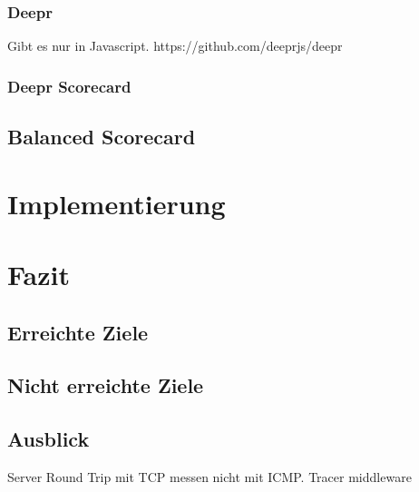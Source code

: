 \subsection{Deepr}
Gibt es nur in Javascript.
https://github.com/deeprjs/deepr
\subsection{Deepr Scorecard}
\section{Balanced Scorecard}
\chapter{Implementierung}

\chapter{Fazit}
\section{Erreichte Ziele}
\section{Nicht erreichte Ziele}
\section{Ausblick}
Server Round Trip mit TCP messen nicht mit ICMP. Tracer middleware
